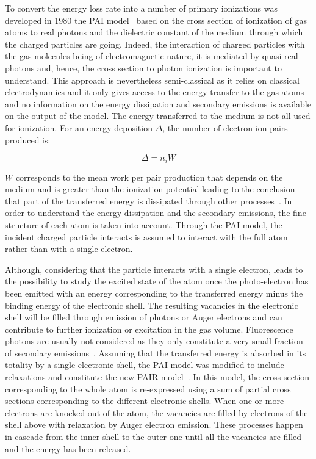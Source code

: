 	To convert the energy loss rate into a number of primary ionizations was developed in 1980 the \acf{PAI} model~\cite{ALLISON1980} based on the cross section of ionization of gas atoms to real photons and the dielectric constant of the medium through which the charged particles are going. Indeed, the interaction of charged particles with the gas molecules being of electromagnetic nature, it is mediated by quasi-real photons and, hence, the cross section to photon ionization is important to understand. This approach is nevertheless semi-classical as it relies on classical electrodynamics and it only gives access to the energy transfer to the gas atoms and no information on the energy dissipation and secondary emissions is available on the output of the model. The energy transferred to the medium is not all used for ionization. For an energy deposition $\Delta$, the number of electron-ion pairs produced is:
	
	\begin{equation}
	\label{eq:npairs}
	\Delta = n_iW
	\end{equation}
	
	$W$ corresponds to the mean work per pair production that depends on the medium and is greater than the ionization potential leading to the conclusion that part of the transferred energy is dissipated through other processes~\cite{VINCENT2017,ICRU31}. In order to understand the energy dissipation and the secondary emissions, the fine structure of each atom is taken into account. Through the PAI model, the incident charged particle interacts is assumed to interact with the full atom rather than with a single electron.
	
	Although, considering that the particle interacts with a single electron, leads to the possibility to study the excited state of the atom once the photo-electron has been emitted with an energy corresponding to the transferred energy minus the binding energy of the electronic shell. The resulting vacancies in the electronic shell will be filled through emission of photons or Auger electrons and can contribute to further ionization or excitation in the gas volume. Fluorescence photons are usually not considered as they only constitute a very small fraction of secondary emissions~\cite{SMIRNOV2005}. Assuming that the transferred energy is absorbed in its totality by a single electronic shell, the PAI model was modified to include relaxations and constitute the new \acf{PAIR} model~\cite{SMIRNOV2005}. In this model, the cross section corresponding to the whole atom is re-expressed using a sum of partial cross sections corresponding to the different electronic shells. When one or more electrons are knocked out of the atom, the vacancies are filled by electrons of the shell above with relaxation by Auger electron emission. These processes happen in cascade from the inner shell to the outer one until all the vacancies are filled and the energy has been released.
	
